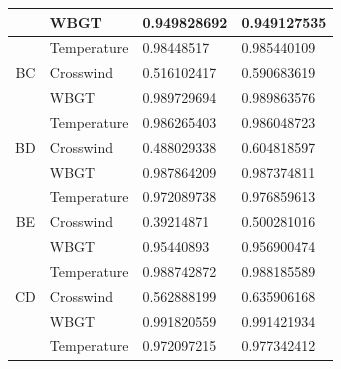 \documentclass[a4paper,12pt]{article}
\begin{document}
\begin{table}[]
\begin{tabular}{llll}
 		& WBGT                             & 0.949828692                              & 0.949127535                               \\ \hline
 		\multicolumn{1}{|l|}{}                      & \multicolumn{1}{l|}{Temperature} & \multicolumn{1}{l|}{0.98448517}          & \multicolumn{1}{l|}{0.985440109}          \\ \hline
 		\multicolumn{1}{|c|}{BC}                    & \multicolumn{1}{l|}{Crosswind}   & \multicolumn{1}{l|}{0.516102417}         & \multicolumn{1}{l|}{0.590683619}          \\ \hline
 		\multicolumn{1}{|l|}{}                      & \multicolumn{1}{l|}{WBGT}        & \multicolumn{1}{l|}{0.989729694}         & \multicolumn{1}{l|}{0.989863576}          \\ \hline
 		& Temperature                      & 0.986265403                              & 0.986048723                               \\
 		\multicolumn{1}{c}{BD}                      & Crosswind                        & 0.488029338                              & 0.604818597                               \\
 		& WBGT                             & 0.987864209                              & 0.987374811                               \\ \hline
 		\multicolumn{1}{|l|}{}                      & \multicolumn{1}{l|}{Temperature} & \multicolumn{1}{l|}{0.972089738}         & \multicolumn{1}{l|}{0.976859613}          \\ \hline
 		\multicolumn{1}{|c|}{BE}                    & \multicolumn{1}{l|}{Crosswind}   & \multicolumn{1}{l|}{0.39214871}          & \multicolumn{1}{l|}{0.500281016}          \\ \hline
 		\multicolumn{1}{|l|}{}                      & \multicolumn{1}{l|}{WBGT}        & \multicolumn{1}{l|}{0.95440893}          & \multicolumn{1}{l|}{0.956900474}          \\ \hline
 		& Temperature                      & 0.988742872                              & 0.988185589                               \\
 		\multicolumn{1}{c}{CD}                      & Crosswind                        & 0.562888199                              & 0.635906168                               \\
 		& WBGT                             & 0.991820559                              & 0.991421934                               \\ \hline
 		\multicolumn{1}{|l|}{}                      & \multicolumn{1}{l|}{Temperature} & \multicolumn{1}{l|}{0.972097215}         & \multicolumn{1}{l|}{0.977342412}          \\ \hline

\end{tabular}
\end{table}
\end{document}
